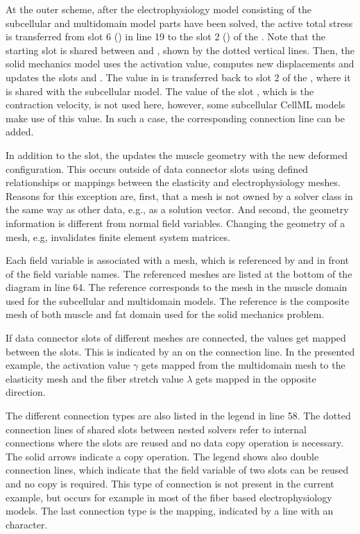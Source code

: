 At the outer  scheme, after the electrophysiology model consisting of the subcellular and multidomain model parts have been solved, the active total stress is transferred from slot 6 () in line 19 to the slot 2 () of the . Note that the starting slot  is shared between  and , shown by the dotted vertical lines. Then, the solid mechanics model uses the activation value, computes new displacements and updates the slots  and . The value in  is transferred back to slot 2 of the , where it is shared with the subcellular model. The value of the slot , which is the contraction velocity, is not used here, however, some subcellular CellML models make use of this value. In such a case, the corresponding connection line can be added.

In addition to the  slot, the  updates the muscle geometry with the new deformed configuration. This occurs outside of data connector slots using defined relationships or mappings between the elasticity and electrophysiology meshes.
Reasons for this exception are, first, that a mesh is not owned by a solver class in the same way as other data, e.g., as a solution vector. And second, the geometry information is different from normal field variables. Changing the geometry of a mesh, e.g, invalidates finite element system matrices.

Each field variable is associated with a mesh, which is referenced by \code{[a]} and \code{[b]} in front of the field variable names. The referenced meshes are listed at the bottom of the diagram in line 64. The reference \code{[a]} corresponds to the mesh in the muscle domain used for the subcellular and multidomain models. The reference \code{[b]} is the composite mesh of both muscle and fat domain used for the solid mechanics problem. 

If data connector slots of different meshes are connected, the values get mapped between the slots. This is indicated by an  on the connection line. In the presented example, the activation value $\gamma$ gets mapped from the multidomain mesh \code{[a]} to the elasticity mesh \code{[b]} and the fiber stretch value $\lambda$ gets mapped in the opposite direction.

The different connection types are also listed in the legend in line 58. The dotted connection lines of shared slots between nested solvers refer to internal connections where the slots are reused and no data copy operation is necessary. The solid arrows indicate a copy operation. The legend shows also double connection lines, which indicate that the field variable of two slots can be reused and no copy is required. This type of connection is not present in the current example, but occurs for example in most of the fiber based electrophysiology models. The last connection type is the mapping, indicated by a line with an  character.

